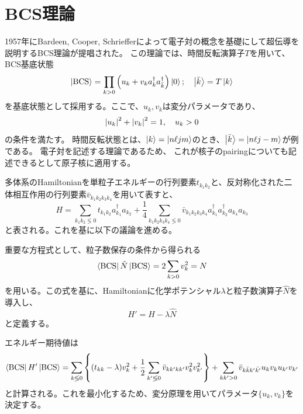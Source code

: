 \documentclass[a4paper]{jsreport}
\newcommand{\BCSket}{\ket{\text{BCS}}}
\newcommand{\BCSbra}{\bra{\text{BCS}}}
\newcommand{\BCSexp}[1]{\bra{\text{BCS}} {#1} \ket{\text{BCS}}}
\begin{document}
  \section{BCS理論}
  1957年にBardeen, Cooper, Schriefferによって電子対の概念を基礎にして超伝導を説明するBCS理論が提唱された。
  この理論では、時間反転演算子\(T\)を用いて、BCS基底状態
  \begin{equation}
      \BCSket=\prod_{k>0}\left(u_k + v_k a^{\dagger}_ka^{\dagger}_{\bar{k}}\right)\ket{0};\quad\ket{\bar{k}}=T\ket{k}
  \end{equation}
  を基底状態として採用する。ここで、\(u_k,v_k\)は変分パラメータであり、
  \begin{equation}
      \abs{u_k}^2+\abs{v_k}^2=1, \quad u_k>0\label{rest}
  \end{equation}
  の条件を満たす。
  時間反転状態とは、\(\ket{k}=\ket{n\ell j m}\)のとき、\(\ket{\bar{k}}=\ket{n\ell j -m}\)が例である。
  電子対を記述する理論であるため、
  これが核子のpairingについても記述できるとして原子核に適用する。
  \par
  多体系のHamiltonianを単粒子エネルギーの行列要素\(t_{k_1k_2}\)と、反対称化された二体相互作用の行列要素\(\bar{v}_{k_1k_2k_3k_4}\)を用いて表すと、
  \begin{equation}
      H=\sum_{k_1 k_2 \lessgtr  0}t_{k_1 k_2} a^{\dagger}_{k_1}a_{k_2}+
      \dfrac{1}{4}\sum_{k_1k_2k_3k_4\lessgtr0}\bar{v}_{k_1k_2k_3k_4}a^{\dagger}_{k_1}a^{\dagger}_{k_2}a_{k_4}a_{k_3}
  \end{equation}
  と表される。これを基に以下の議論を進める。\par
  重要な方程式として、粒子数保存の条件から得られる
  \begin{equation}
      \BCSbra \hat{N} \BCSket =2 \sum_{k>0} v_k^2 = N\label{number}
  \end{equation}
  を用いる。この式を基に、Hamiltonianに化学ポテンシャル\(\lambda\)と粒子数演算子\(\hat{N}\)を導入し、
  \begin{equation}
      H'=H-\lambda \hat{N}
  \end{equation}
  と定義する。\par
  エネルギー期待値は
  \begin{equation}
      \BCSexp{H'} =\sum_{k\lessgtr0}\left\{(t_{kk}-\lambda)v_{k}^2 +\frac{1}{2}\sum_{k'\lessgtr0}\bar{v}_{kk'kk'}v_{k}^2v_{k'}^2  \right\}
        +\sum_{kk'>0}\bar{v}_{k\bar{k}k'\bar{k'}}u_kv_ku_{k'}v_{k'}
  \end{equation}
  と計算される。これを最小化するため、変分原理を用いてパラメータ\(\{u_k,v_k\}\)を決定する。
\end{document}
